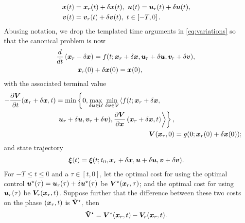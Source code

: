 %
\begin{subequations}
	\begin{align}
		\bm{x}(t) &= \bm{x}_r(t) + \delta\bm{x}(t), \,\, 	\bm{u}(t) = \bm{u}_r(t) + \delta\bm{u}(t), \\
		\bm{v}(t) &= \bm{v}_r(t) + \delta\bm{v}(t), \,\, t \in \left[-T, 0\right].
	\end{align}
	\label{eq:variations}
\end{subequations}
%
Abusing notation, we drop the templated time arguments in \eqref{eq:variations} so that the canonical problem is now 
%
	\begin{align}
		\dfrac{d}{dt}\left(\bm{x}_r + \delta \bm{x}\right) &= f(t; \bm{x}_r + \delta \bm{x}, \bm{u}_r + \delta \bm{u}, \bm{v}_r + \delta \bm{v}), \,  \\
	 \bm{x}_r(0) 	&+ \delta \bm{x}(0) = \bm{x}(0),
	\end{align}
%
with the associated terminal value 
%
\begin{align}
	\begin{split}
		-\frac{\partial \valuefunc}{\partial t}(\state_r + \delta \state, t)
		&= 
		\min \left\{0,  
		\max_{\delta \control \in \mathcal{U}} \, \min_{\delta \disturb \in \mathcal{V}} \left\langle f(t; \state_r + \delta \state, \right. \right. \\
		&  \left. \left.  \control_r + \delta \control, \disturb_r + \delta \disturb), \dfrac{\partial \valuefunc}{\partial \state}\left(\state_r + \delta \state, t \right) \right\rangle \right\},
	\end{split} \nonumber \\
	\valuefunc(\state_r, 0) &= g(0; \state_r(0) + \delta \state (0));
	\label{eq:canonical_value}
\end{align}
%
and state trajectory
%
\begin{align}
	\bm{\xi}(t) = \bm{\xi}(t; t_0, \bm{x}_r + \delta\bm{x}, 	\bm{u}+\delta\bm{u},\bm{v}+\delta\bm{v}).
\end{align}
%
%
For $-T \le t \le 0$ and a $\tau \in [t, 0]$, let the optimal cost  for using the optimal control $\bm{u}^\star(\tau) = \bm{u}_r(\tau) + \delta \bm{u}^\star(\tau)$ be $\bm{V}^\star(\bm{x}_r, \tau)$; and the optimal cost for using $\bm{u}_r(\tau)$ be $\bm{V}_r(\bm{x}_r, t)$. Suppose further that the difference between these two costs on the phase $\left(\bm{x}_r, t\right)$ is $\mathbf{\tilde{V}}^\star$, then
%
\begin{align}
	\costdiff^\star =\valuefunc^\star(\state_r, t) -\valuefunc_r(\state_r, t).
	\label{eq:cost_diff}
\end{align}
